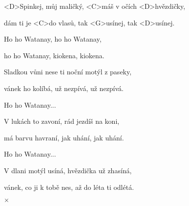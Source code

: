 

\zs
<D>Spinkej, můj maličký, <C>máš v očích <D>hvězdičky,

dám ti je <C>do vlasů, tak <G>usínej, tak <D>usínej.
\ks

\zr
Ho ho Watanay, ho ho Watanay,

ho ho Watanay, kiokena, kiokena.
\kr

\zs
Sladkou vůni nese ti noční motýl z paseky,

vánek ho kolíbá, už nezpívá, už nezpívá.
\ks

\zr
Ho ho Watanay...
\kr

\zs
V lukách to zavoní, rád jezdíš na koni,

má barvu havraní, jak uhání, jak uhání.
\ks

\zr
Ho ho Watanay...
\kr

\zs
V dlani motýl usíná, hvězdička už zhasíná,

vánek, co ji k tobě nes, až do léta ti odlétá.
\ks

$\times$ \kr

\kp
